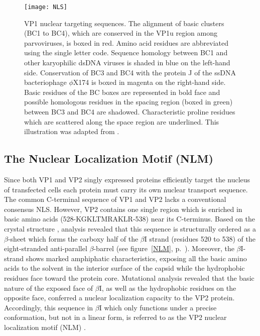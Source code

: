 \begin{figure}
\centering
  \texttt{[image: NLS]}
  \caption[Nuclear localisation signal (NLS)]
   {VP1 nuclear targeting sequences. The alignment of basic clusters (BC1 to BC4), which are conserved in the VP1u region among parvoviruses, is boxed in red. Amino acid residues are abbreviated using the single letter code. Sequence homology between BC1 and other karyophilic dsDNA viruses is shaded in blue on the left-hand side. Conservation of BC3 and BC4 with the protein J of the ssDNA bacteriophage $\phi$X174 is boxed in magenta on the right-hand side. Basic residues of the BC boxes are represented in bold face and possible homologous residues in the spacing region (boxed in green) between BC3 and BC4 are shadowed. Characteristic proline residues which are scattered along the space region are underlined. This illustration was adapted from \cite{pmid12072505, almendral}.}
\label{NLS}
\end{figure}


\subsection{The Nuclear Localization Motif (NLM)}
\label{NLM1}
Since both VP1 and VP2 singly expressed proteins efficiently target the nucleus of transfected cells \cite{pmid8416366, pmid12072505} each protein must carry its own nuclear transport sequence. The common C-terminal sequence of VP1 and VP2 lacks a conventional consensus NLS. However, VP2 contains one single region which is enriched in basic amino acids (528-KGKLTMRAKLR-538) near its C-terminus. Based on the crystal structure \cite{pmid9817841, pmid2006420}, analysis revealed that this sequence is structurally ordered as a $\beta$-sheet which forms the carboxy half of the $\beta$I strand (residues 520 to 538) of the eight-stranded anti-parallel $\beta$-barrel (see figure~\ref{NLM}, p.~\pageref{NLM}). Moreover, the $\beta$I-strand shows marked amphiphatic characteristics, exposing all the basic amino acids to the solvent in the interior surface of the capsid while the hydrophobic residues face toward the protein core. Mutational analysis revealed that the basic nature of the exposed face of $\beta$I, as well as the hydrophobic residues on the opposite face, conferred a nuclear localization capacity to the VP2 protein. Accordingly, this sequence in $\beta$I which only functions under a precise conformation, but not in a linear form, is referred to as the VP2 nuclear localization motif (NLM) \cite{pmid10729155}.        


